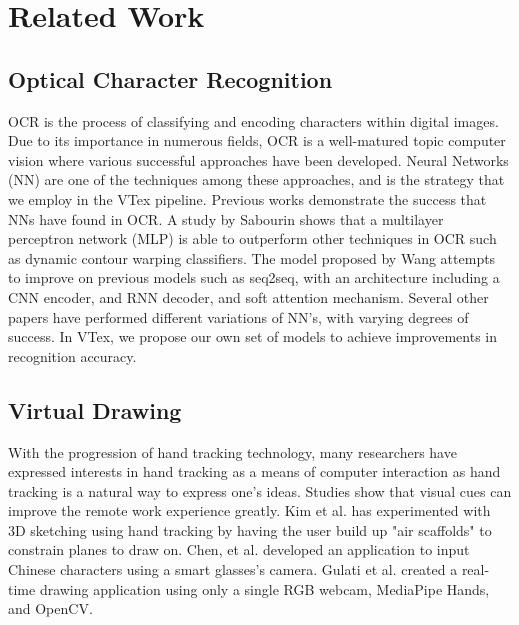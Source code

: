 \section{Related Work}
\label{sec:related}

\subsection{Optical Character Recognition}

OCR is the process of classifying and encoding characters within digital images. Due to its importance in numerous fields, OCR is a well-matured topic computer vision where various successful approaches have been developed. Neural Networks (NN) are one of the techniques among these approaches, and is the strategy that we employ in the VTex pipeline. Previous works demonstrate the success that NNs have found in OCR. A study by Sabourin \cite{SABOURIN1992843} shows that a multilayer perceptron network (MLP) is able to outperform other techniques in OCR such as dynamic contour warping classifiers. The model proposed by Wang \cite{Wang} attempts to improve on previous models such as seq2seq, with an architecture including a CNN encoder, and RNN decoder, and soft attention mechanism. Several other papers have performed different variations of NN's, with varying degrees of success\cite{Peng, Genthial, Wang02}. In VTex, we propose our own set of models to achieve improvements in recognition accuracy.


\subsection{Virtual Drawing}

With the progression of hand tracking technology, many researchers have expressed interests in hand tracking as a means of computer interaction as hand tracking is a natural way to express one's ideas. Studies show that visual cues can improve the remote work experience greatly\cite{SH, TEO}. Kim et al. has experimented with 3D sketching using hand tracking by having the user build up "air scaffolds" to constrain planes to draw on\cite{KIM}. Chen, et al. developed an application to input Chinese characters using a smart glasses’s camera\cite{CHEN}. Gulati et al. created a real-time drawing application using only a single RGB webcam, MediaPipe Hands, and OpenCV\cite{MPDrawing}. 


